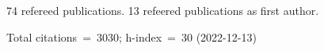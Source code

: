 74 refereed publications. 13 refeered publications as first author.

Total citations~=~3030; h-index~=~30 (2022-12-13)